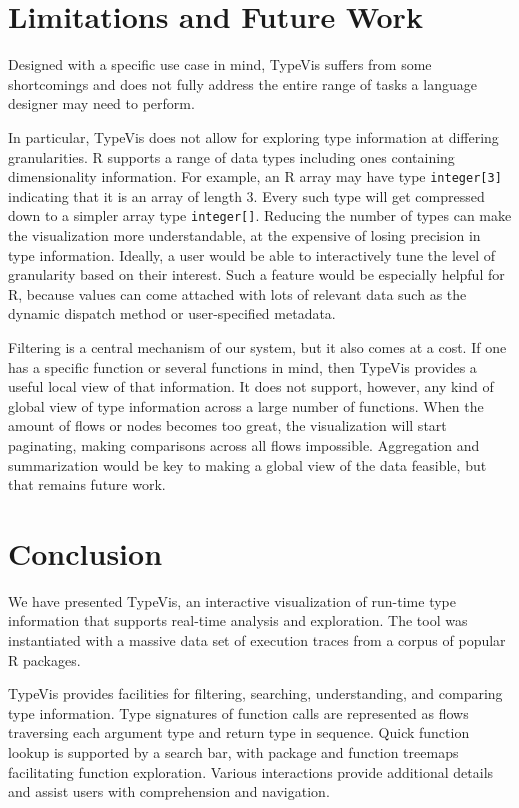 \documentclass[review]{vgtc}                 %
\newcommand{\typevis}{{\sc TypeVis}\xspace}
\begin{document}

\section{Limitations and Future Work}

Designed with a specific use case in mind,
\typevis suffers from some shortcomings
and does not fully address the entire range of tasks
a language designer may need to perform.

In particular, \typevis does not allow for exploring 
type information at differing granularities.
R supports a range of data types
including ones containing dimensionality information.
For example, an R array may have type {\tt integer[3]}
indicating that it is an array of length $3$.
Every such type will get compressed down %
to a simpler array
type {\tt integer[]}.
Reducing the number of types can make the visualization
more understandable, at the expensive of losing
precision in type information.
Ideally, a user would be able to interactively tune
the level of granularity based on their interest.
Such a feature would be especially helpful for R,
because values can come attached with lots of relevant
data such as the dynamic dispatch method
or user-specified metadata.

Filtering is a central mechanism of our system,
but it also comes at a cost.
If one has a specific function or several functions
in mind, then \typevis provides a useful
local view of that information.
It does not support, however, any kind of global
view of type information across a large number of
functions. When the amount of flows or nodes
becomes too great, the visualization will start
paginating, making comparisons across all flows impossible.
Aggregation and summarization would be key to
making a global view of the data feasible, but that remains future work.


\section{Conclusion}

We have presented \typevis, an interactive visualization
of run-time type information
that supports real-time analysis and exploration.
The tool was instantiated with a massive data set of
execution traces from a corpus of popular R packages.

\typevis provides facilities for filtering, searching,
understanding, and comparing type information.
Type signatures of function calls
are represented as flows traversing
each argument type and return type in sequence.
Quick function lookup is supported by a search bar,
with package and function treemaps facilitating
function exploration.
Various interactions provide additional details and
assist users with comprehension and navigation.
\end{document}
